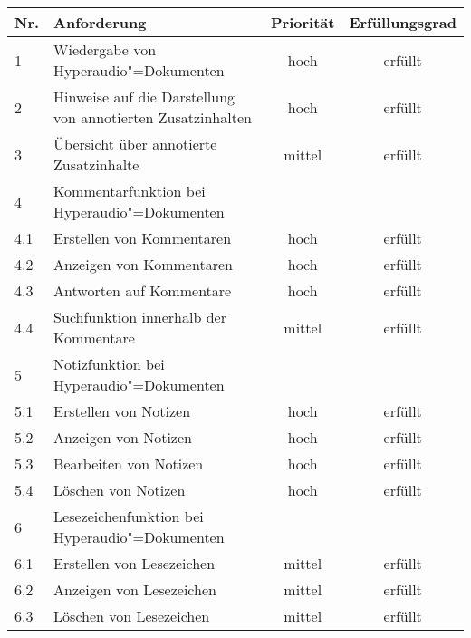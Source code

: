 \begin{table}[!ht]
\def\arraystretch{1.4}

\begin{tabularx}{\textwidth}{lXcc}      
    \hline
    Nr. & Anforderung & Priorität & Erfüllungsgrad
    \\\hline
    1 & Wiedergabe von Hyperaudio"=Dokumenten & hoch & erfüllt\\
    2 & Hinweise auf die Darstellung von annotierten Zusatzinhalten & hoch & erfüllt\\
    3 & Übersicht über annotierte Zusatzinhalte & mittel & erfüllt\\
    4 & Kommentarfunktion bei Hyperaudio"=Dokumenten & & \\
    4.1 & \hspace*{0.5cm} Erstellen von Kommentaren & hoch & erfüllt\\
    4.2 & \hspace*{0.5cm} Anzeigen von Kommentaren & hoch & erfüllt\\
    4.3 & \hspace*{0.5cm} Antworten auf Kommentare & hoch & erfüllt\\
    4.4 & \hspace*{0.5cm} Suchfunktion innerhalb der Kommentare & mittel & erfüllt\\ 
    5 & Notizfunktion bei Hyperaudio"=Dokumenten & & \\
    5.1 & \hspace*{0.5cm} Erstellen von Notizen & hoch & erfüllt\\
    5.2 & \hspace*{0.5cm} Anzeigen von Notizen & hoch & erfüllt\\
    5.3 & \hspace*{0.5cm} Bearbeiten von Notizen & hoch & erfüllt\\
   	5.4 & \hspace*{0.5cm} Löschen von Notizen & hoch & erfüllt\\
    6 & Lesezeichenfunktion bei Hyperaudio"=Dokumenten & & \\
    6.1 & \hspace*{0.5cm} Erstellen von Lesezeichen & mittel & erfüllt\\
    6.2 & \hspace*{0.5cm} Anzeigen von Lesezeichen & mittel & erfüllt\\
   	6.3 & \hspace*{0.5cm} Löschen von Lesezeichen & mittel & erfüllt\\

\end{tabularx}
\end{table}
